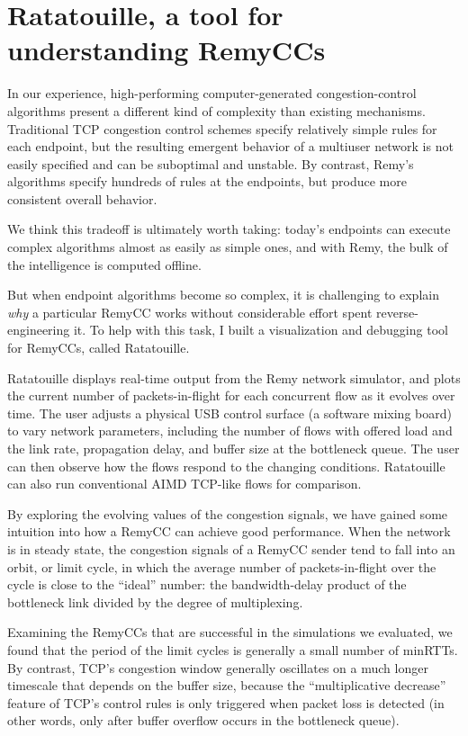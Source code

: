 \section{Ratatouille, a tool for understanding RemyCCs}

In our experience, high-performing computer-generated
congestion-control algorithms present a different kind of complexity
than existing mechanisms. Traditional TCP congestion control schemes
specify relatively simple rules for each endpoint, but the resulting
emergent behavior of a multiuser network is not easily specified and
can be suboptimal and unstable. By contrast, Remy's algorithms specify
hundreds of rules at the endpoints, but produce more consistent
overall behavior.

We think this tradeoff is ultimately worth taking: today's endpoints
can execute complex algorithms almost as easily as simple ones, and
with Remy, the bulk of the intelligence is computed offline.

But when endpoint algorithms become so complex, it is challenging to
explain \emph{why} a particular RemyCC works without considerable
effort spent reverse-engineering it. To help with this task, I built a
visualization and debugging tool for RemyCCs, called Ratatouille.

Ratatouille displays real-time output from the Remy network simulator,
and plots the current number of packets-in-flight for each concurrent
flow as it evolves over time. The user adjusts a physical USB control
surface (a software mixing board) to vary network parameters,
including the number of flows with offered load and the link rate,
propagation delay, and buffer size at the bottleneck queue. The user
can then observe how the flows respond to the changing
conditions. Ratatouille can also run conventional AIMD TCP-like flows
for comparison.

By exploring the evolving values of the congestion signals, we have
gained some intuition into how a RemyCC can achieve good
performance. When the network is in steady state, the congestion
signals of a RemyCC sender tend to fall into an orbit, or limit cycle,
in which the average number of packets-in-flight over the cycle is
close to the ``ideal'' number: the bandwidth-delay product of the
bottleneck link divided by the degree of multiplexing.

Examining the RemyCCs that are successful in the simulations we
evaluated, we found that the period of the limit cycles is generally a
small number of minRTTs. By contrast, TCP's congestion window
generally oscillates on a much longer timescale that depends on the
buffer size, because the ``multiplicative decrease'' feature of TCP's
control rules is only triggered when packet loss is detected (in other
words, only after buffer overflow occurs in the bottleneck queue).

